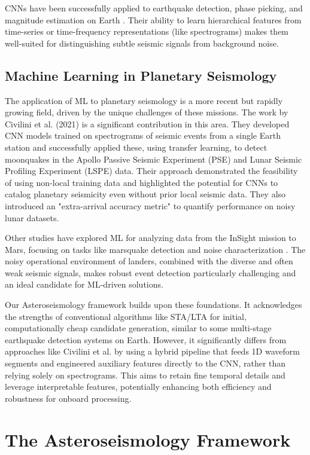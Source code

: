 \documentclass[conference]{IEEEtran}
\begin{document}
CNNs have been successfully applied to earthquake detection, phase picking, and magnitude estimation on Earth \cite{b17, b20}. Their ability to learn hierarchical features from time-series or time-frequency representations (like spectrograms) makes them well-suited for distinguishing subtle seismic signals from background noise.

\subsection{Machine Learning in Planetary Seismology}
The application of ML to planetary seismology is a more recent but rapidly growing field, driven by the unique challenges of these missions. The work by Civilini et al. (2021) \cite{favPaper} is a significant contribution in this area. They developed CNN models trained on spectrograms of seismic events from a single Earth station and successfully applied these, using transfer learning, to detect moonquakes in the Apollo Passive Seismic Experiment (PSE) and Lunar Seismic Profiling Experiment (LSPE) data. Their approach demonstrated the feasibility of using non-local training data and highlighted the potential for CNNs to catalog planetary seismicity even without prior local seismic data. They also introduced an "extra-arrival accuracy metric" to quantify performance on noisy lunar datasets.

Other studies have explored ML for analyzing data from the InSight mission to Mars, focusing on tasks like marsquake detection and noise characterization \cite{b21}. The noisy operational environment of landers, combined with the diverse and often weak seismic signals, makes robust event detection particularly challenging and an ideal candidate for ML-driven solutions.

Our Asteroseismology framework builds upon these foundations. It acknowledges the strengths of conventional algorithms like STA/LTA for initial, computationally cheap candidate generation, similar to some multi-stage earthquake detection systems on Earth. However, it significantly differs from approaches like Civilini et al. \cite{favPaper} by using a hybrid pipeline that feeds 1D waveform segments and engineered auxiliary features directly to the CNN, rather than relying solely on spectrograms. This aims to retain fine temporal details and leverage interpretable features, potentially enhancing both efficiency and robustness for onboard processing.

\section{The Asteroseismology Framework}
\end{document}
